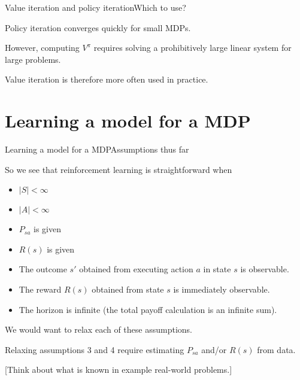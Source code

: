 \documentclass{beamer}
\begin{document}
\begin{frame}{Value iteration and policy iteration}{Which to use?}

  Policy iteration converges quickly for small MDPs.

  \medskip

  However, computing $V^\pi$ requires solving a prohibitively large
  linear system for large problems.

  \medskip

  Value iteration is therefore more often used in practice.
  
\end{frame}

\section{Learning a model for a MDP}

\begin{frame}{Learning a model for a MDP}{Assumptions thus far}

  So we see that reinforcement learning is straightforward when
  \begin{itemize}
  \item $|S| < \infty$
  \item $|A| < \infty$
  \item $P_{sa}$ is given
  \item $R(s)$ is given
  \item The outcome $s'$ obtained from executing action $a$ in state
    $s$ is observable.
  \item The reward $R(s)$ obtained from state $s$ is immediately
    observable.
  \item The \alert{horizon} is infinite (the total payoff calculation
    is an infinite sum).
  \end{itemize}

  \medskip

  We would want to relax each of these assumptions.

  \medskip

  Relaxing assumptions 3 and 4 require \alert{estimating $P_{sa}$
    and/or $R(s)$ from data}.

  \medskip

  [Think about what is known in example real-world problems.]

\end{frame}
\end{document}
